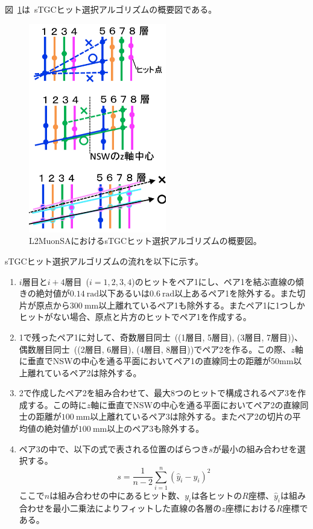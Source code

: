 図~\ref{fig:5-1}は~sTGCヒット選択アルゴリズムの概要図である。

\begin{figure}[H]
  \centering
  \includegraphics[clip, width=6cm]{fig/5/sTGC_hitSelectAlg.png}
  \caption{L2MuonSAにおけるsTGCヒット選択アルゴリズムの概要図\cite{article:kumaokaJPS}。}
  \label{fig:5-1}
\end{figure}

sTGCヒット選択アルゴリズムの流れを以下に示す。
\begin{enumerate}
    \item $i$層目と$i+4$層目~($i=1, 2, 3, 4$)のヒットをペア1にし、ペア1を結ぶ直線の傾きの絶対値が$\SI{0.14}{\radian}$以下あるいは$\SI{0.6}{\radian}$以上あるペア1を除外する。また切片が原点から$\SI{300}{\mm}$以上離れているペア1も除外する。またペア1に1つしかヒットがない場合、原点と片方のヒットでペア1を作成する。
    \item 1で残ったペア1に対して、奇数層目同士~((1層目, 5層目), (3層目, 7層目))、偶数層目同士~((2層目, 6層目), (4層目, 8層目))でペア2を作る。この際、$z$軸に垂直でNSWの中心を通る平面においてペア1の直線同士の距離が50mm以上離れているペア2は除外する。
    \item 2で作成したペア2を組み合わせて、最大8つのヒットで構成されるペア3を作成する。この時に$z$軸に垂直でNSWの中心を通る平面においてペア2の直線同士の距離が$\SI{100}{\mm}$以上離れているペア3は除外する。またペア2の切片の平均値の絶対値が$\SI{100}{\mm}$以上のペア3も除外する。
    \item ペア3の中で、以下の式で表される位置のばらつき$s$が最小の組み合わせを選択する。
    \begin{equation}
        s=\frac{1}{n-2} \sum_{i=1}^n\left(\hat{y}_i-y_i\right)^2\label{equ5-1}
    \end{equation}
    ここで$n$は組み合わせの中にあるヒット数、$y_i$は各ヒットの$R$座標、$\hat{y}_i$は組み合わせを最小二乗法によりフィットした直線の各層の$z$座標における$R$座標である。
\end{enumerate}

